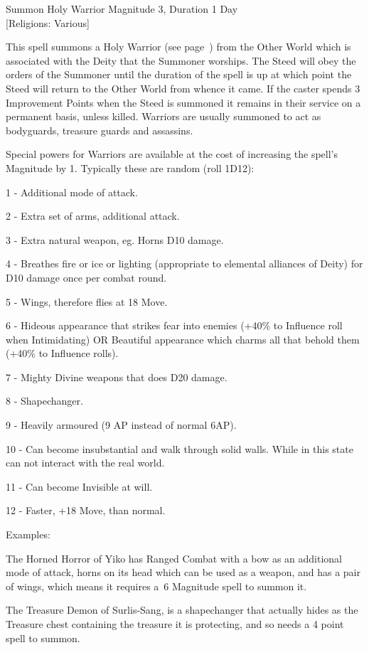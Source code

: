 \begin{rpg-spell}
{Summon Holy Warrior}
{Magnitude 3, Duration 1 Day\\{[Religions: Various]}}

This spell summons a Holy Warrior (see page~\pageref{monster:holy-warrior}) from the Other World which is associated with the Deity that the Summoner worships. The Steed will obey the orders of the Summoner until the duration of the spell is up at which point the Steed will return to the Other World from whence it came. If the caster spends 3 Improvement Points when the Steed is summoned it remains in their service on a permanent basis, unless killed. Warriors are usually summoned to act as bodyguards, treasure guards and assassins.

Special powers for Warriors are available at the cost of increasing the spell’s Magnitude by 1. Typically these are random (roll 1D12):
\begin{rpg-list}
\item 1 - Additional mode of attack.
\item 2 - Extra set of arms, additional attack.
\item 3 - Extra natural weapon, eg. Horns D10 damage.
\item 4 - Breathes fire or ice or lighting (appropriate to elemental alliances of Deity) for D10 damage once per combat round.
\item 5 - Wings, therefore flies at 18 Move.
\item 6 - Hideous appearance that strikes fear into enemies (+40\% to Influence roll when Intimidating) OR Beautiful appearance which charms all that behold them (+40\% to Influence rolls).
\item 7 - Mighty Divine weapons that does D20 damage.
\item 8 - Shapechanger.
\item 9 - Heavily armoured (9 AP instead of normal 6AP).
\item 10 - Can become insubstantial and walk through solid walls. While in this state can not interact with the real world.
\item 11 - Can become Invisible at will.
\item 12 - Faster, +18 Move, than normal.
\end{rpg-list}

Examples:

The Horned Horror of Yiko has Ranged Combat with a bow as an additional mode of attack, horns on its head which can be used as a weapon, and has a pair of wings, which means it requires a 6 Magnitude spell to summon it.

The Treasure Demon of Surlis-Sang, is a shapechanger that actually hides as the Treasure chest containing the treasure it is protecting, and so needs a 4 point spell to summon.
\end{rpg-spell}

